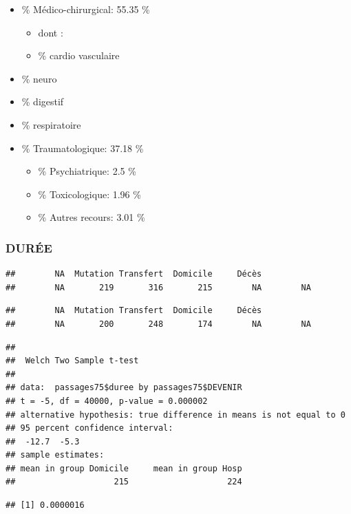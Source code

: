 \documentclass[]{article}
\begin{document}
\begin{itemize}
\itemsep1pt\parskip0pt
\item
  \% Médico-chirurgical: 55.35 \%

  \begin{itemize}
  \itemsep1pt\parskip0pt
  \item
    dont :
  \item
    \% cardio vasculaire
  \end{itemize}
\item
  \% neuro
\item
  \% digestif
\item
  \% respiratoire
\item
  \% Traumatologique: 37.18 \%

  \begin{itemize}
  \itemsep1pt\parskip0pt
  \item
    \% Psychiatrique: 2.5 \%
  \item
    \% Toxicologique: 1.96 \%
  \item
    \% Autres recours: 3.01 \%
  \end{itemize}
\end{itemize}

\subsubsection{DURÉE}\label{duree}

\begin{verbatim}
##        NA  Mutation Transfert  Domicile     Décès           
##        NA       219       316       215        NA        NA
\end{verbatim}

\begin{verbatim}
##        NA  Mutation Transfert  Domicile     Décès           
##        NA       200       248       174        NA        NA
\end{verbatim}

\begin{verbatim}
## 
##  Welch Two Sample t-test
## 
## data:  passages75$duree by passages75$DEVENIR
## t = -5, df = 40000, p-value = 0.000002
## alternative hypothesis: true difference in means is not equal to 0
## 95 percent confidence interval:
##  -12.7  -5.3
## sample estimates:
## mean in group Domicile     mean in group Hosp 
##                    215                    224
\end{verbatim}

\begin{verbatim}
## [1] 0.0000016
\end{verbatim}
\end{document}
